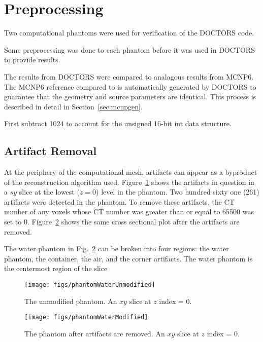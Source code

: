 

\section{Preprocessing}
Two computational phantoms were used for verification of the DOCTORS code.

Some preprocessing was done to each phantom before it was used in DOCTORS to provide results.

The results from DOCTORS were compared to analagous results from MCNP6. The MCNP6 reference compared to is automatically generated by DOCTORS to guarantee that the geometry and source parameters are identical. This process is described in detail in Section~\ref{sec:mcnpgen}.

First subtract 1024 to account for the unsigned 16-bit int data structure.

\subsection{Artifact Removal}
At the periphery of the computational mesh, artifacts can appear as a byproduct of the reconstruction algorithm used. Figure~\ref{fig:phantomWaterUnmodified} shows the artifacts in question in a $sy$ slice at the lowest ($z = 0$) level in the phantom. Two hundred sixty one (261) artifacts were detected in the phantom. To remove these artifacts, the CT number of any voxels whose CT number was greater than or equal to 65500 was set to 0. Figure~\ref{fig:phantomWaterModified} shows the same cross sectional plot after the artifacts are removed.

The water phantom in Fig.~\ref{fig:phantomWaterModified} can be broken into four regions: the water phantom, the container, the air, and the corner artifacts. The water phantom is the centermost region of the slice

\begin{figure}[tb]
  \begin{center}
   \texttt{[image: figs/phantomWaterUnmodified]}
  \end{center}
  \caption{The unmodified phantom. An $xy$ slice at $z$ index = 0.}
\label{fig:phantomWaterUnmodified}
\end{figure}

\begin{figure}[tb]
  \begin{center}
   \texttt{[image: figs/phantomWaterModified]}
  \end{center}
  \caption{The phantom after artifacts are removed. An $xy$ slice at $z$ index = 0.}
\label{fig:phantomWaterModified}
\end{figure}



